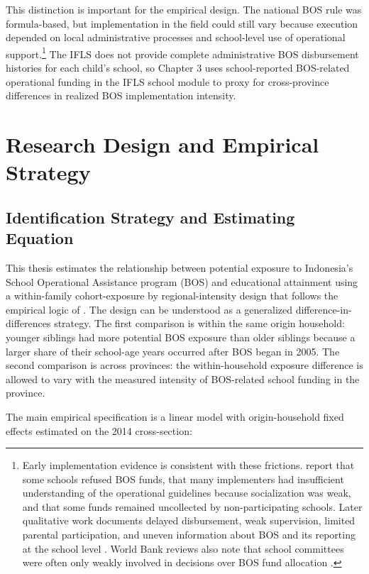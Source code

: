 \documentclass[a4paper, 12pt]{article}
\begin{document}
\begin{doublespacing}
This distinction is important for the empirical design. The national BOS rule was formula-based, but implementation in the field could still vary because execution depended on local administrative processes and school-level use of operational support.\footnote{Early implementation evidence is consistent with these frictions. \citet{IsdijosoEtAl2006} report that some schools refused BOS funds, that many implementers had insufficient understanding of the operational guidelines because socialization was weak, and that some funds remained uncollected by non-participating schools. Later qualitative work documents delayed disbursement, weak supervision, limited parental participation, and uneven information about BOS and its reporting at the school level \citep{UNESCOIIEPUNICEF2016,SMERUUNESCO2024}. World Bank reviews also note that school committees were often only weakly involved in decisions over BOS fund allocation \citep{WorldBank2014}.} The IFLS does not provide complete administrative BOS disbursement histories for each child's school, so Chapter 3 uses school-reported BOS-related operational funding in the IFLS school module to proxy for cross-province differences in realized BOS implementation intensity.

\section{Research Design and Empirical Strategy}
\subsection{Identification Strategy and Estimating Equation}
This thesis estimates the relationship between potential exposure to Indonesia's School Operational Assistance program (BOS) and educational attainment using a within-family cohort-exposure by regional-intensity design that follows the empirical logic of \citet{Duflo2001}. The design can be understood as a generalized difference-in-differences strategy. The first comparison is within the same origin household: younger siblings had more potential BOS exposure than older siblings because a larger share of their school-age years occurred after BOS began in 2005. The second comparison is across provinces: the within-household exposure difference is allowed to vary with the measured intensity of BOS-related school funding in the province.

The main empirical specification is a linear model with origin-household fixed effects estimated on the 2014 cross-section:


\end{doublespacing}
\end{document}
